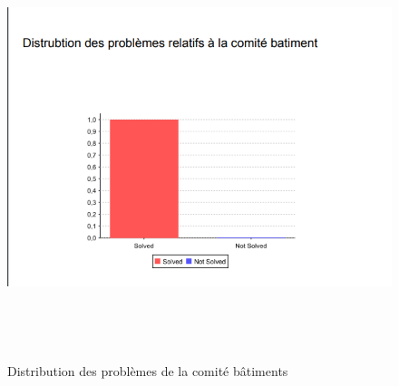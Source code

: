 \documentclass[11.5pt]{report}
\begin{document}
\newpage
\begin{figure}[h]
	
	\begin{center}
		\includegraphics[width=500pt,height=350pt]{d1.png} 
		\caption{Distribution des problèmes de la comité bâtiments}
	\end{center}
	
\end{figure}
\end{document}
